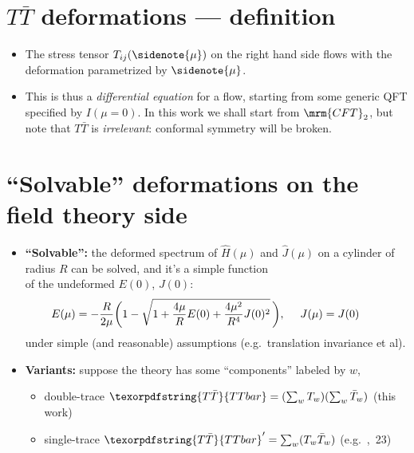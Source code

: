 \documentclass[11pt]{article}
\renewenvironment{frame}[1]%
	{\section*{#1}}%
	{}
\newcommand{\TTbar}{\texorpdfstring{\ensuremath{T\bar{T}}}{TTbar}\xspace}
\begin{document}
\begin{multicols}{3}
\begin{frame}{\TTbar deformations --- definition}{%
	\citeTTbar
}
\begin{itemize}
\item The stress tensor $T_{ij}(\sidenote{\mu})$ on the right hand side flows with the deformation parametrized by $\sidenote{\mu}$. 



\item This is thus a \textit{differential equation} for a flow, starting from some generic QFT specified by $I(\mu = 0)$. In this work we shall start from $\mrm{CFT}_2$, but note that \TTbar is \textit{irrelevant}: conformal symmetry will be broken.

\end{itemize}
\end{frame}


\begin{frame}{``Solvable'' deformations on the field theory side}{%
	\citeTTbar
}
\begin{itemize}

\item \textbf{``Solvable'':} the deformed spectrum of $\hat{H}(\mu)$ and $\hat{J}(\mu)$ on a cylinder of radius $R$ can be solved, 
and it's a simple function\\
 of the undeformed $E(0)$, $J(0)$:
\begin{equation}
\hspace{-2em}
	E(\mu) = - \frac{R }{ 2\mu } \bigg(1-\sqrt{1 + \frac{4\mu}{R} E(0) + \frac{4\mu^2}{R^4} J(0)^2 }
	\,\bigg), \ \quad J(\mu)=J(0) %
\end{equation}
under simple (and reasonable) assumptions (e.g.~translation invariance et al). 

\item \textbf{Variants:} suppose the theory has some ``components'' labeled by $w$,



\begin{itemize}
\item double-trace $\TTbar = (\sum_w T_w) (\sum_w \bar{T}_w)$ (this work)
\item single-trace $\TTbar' = \sum_w (T_w \bar{T}_w)$ (e.g.~\textit{\citeauthor{Cui:2023jrb}},~23)
\end{itemize}

\end{itemize}

\vspace{.5\baselineskip}
\end{frame}


\end{multicols}
\end{document}
